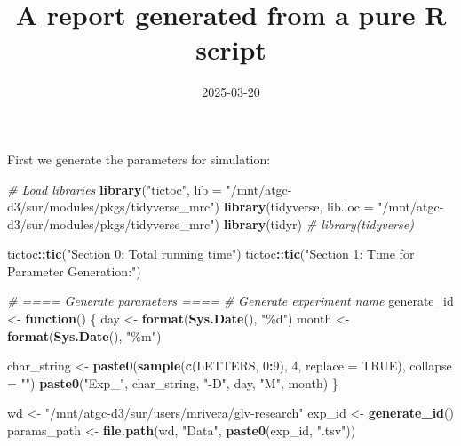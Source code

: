 \documentclass[
]{article}
\title{A report generated from a pure R script}
\author{}
\date{\vspace{-2.5em}2025-03-20}
\newenvironment{Shaded}{\begin{snugshade}}{\end{snugshade}}
\newcommand{\AttributeTok}[1]{\textcolor[rgb]{0.13,0.29,0.53}{#1}}
\newcommand{\CommentTok}[1]{\textcolor[rgb]{0.56,0.35,0.01}{\textit{#1}}}
\newcommand{\ConstantTok}[1]{\textcolor[rgb]{0.56,0.35,0.01}{#1}}
\newcommand{\ControlFlowTok}[1]{\textcolor[rgb]{0.13,0.29,0.53}{\textbf{#1}}}
\newcommand{\DecValTok}[1]{\textcolor[rgb]{0.00,0.00,0.81}{#1}}
\newcommand{\FunctionTok}[1]{\textcolor[rgb]{0.13,0.29,0.53}{\textbf{#1}}}
\newcommand{\NormalTok}[1]{#1}
\newcommand{\OtherTok}[1]{\textcolor[rgb]{0.56,0.35,0.01}{#1}}
\newcommand{\SpecialCharTok}[1]{\textcolor[rgb]{0.81,0.36,0.00}{\textbf{#1}}}
\newcommand{\StringTok}[1]{\textcolor[rgb]{0.31,0.60,0.02}{#1}}
\begin{document}
\maketitle

First we generate the parameters for simulation:

\begin{Shaded}
\begin{Highlighting}[]
\CommentTok{\# Load libraries}
\FunctionTok{library}\NormalTok{(}\StringTok{"tictoc"}\NormalTok{, }\AttributeTok{lib =} \StringTok{"/mnt/atgc{-}d3/sur/modules/pkgs/tidyverse\_mrc"}\NormalTok{)}
\FunctionTok{library}\NormalTok{(tidyverse, }\AttributeTok{lib.loc =} \StringTok{"/mnt/atgc{-}d3/sur/modules/pkgs/tidyverse\_mrc"}\NormalTok{)}
\FunctionTok{library}\NormalTok{(tidyr)}
\CommentTok{\# library(tidyverse) }

\NormalTok{tictoc}\SpecialCharTok{::}\FunctionTok{tic}\NormalTok{(}\StringTok{"Section 0: Total running time"}\NormalTok{)}
\NormalTok{tictoc}\SpecialCharTok{::}\FunctionTok{tic}\NormalTok{(}\StringTok{"Section 1: Time for Parameter Generation:"}\NormalTok{)}

\CommentTok{\# ==== Generate parameters ====}
\CommentTok{\# Generate experiment name}
\NormalTok{generate\_id }\OtherTok{\textless{}{-}} \ControlFlowTok{function}\NormalTok{() \{}
\NormalTok{  day }\OtherTok{\textless{}{-}} \FunctionTok{format}\NormalTok{(}\FunctionTok{Sys.Date}\NormalTok{(), }\StringTok{"\%d"}\NormalTok{)}
\NormalTok{  month }\OtherTok{\textless{}{-}} \FunctionTok{format}\NormalTok{(}\FunctionTok{Sys.Date}\NormalTok{(), }\StringTok{"\%m"}\NormalTok{)}
  
\NormalTok{  char\_string }\OtherTok{\textless{}{-}} \FunctionTok{paste0}\NormalTok{(}\FunctionTok{sample}\NormalTok{(}\FunctionTok{c}\NormalTok{(LETTERS, }\DecValTok{0}\SpecialCharTok{:}\DecValTok{9}\NormalTok{), }\DecValTok{4}\NormalTok{, }\AttributeTok{replace =} \ConstantTok{TRUE}\NormalTok{), }\AttributeTok{collapse =} \StringTok{""}\NormalTok{)}
  \FunctionTok{paste0}\NormalTok{(}\StringTok{"Exp\_"}\NormalTok{, char\_string, }\StringTok{"{-}D"}\NormalTok{, day, }\StringTok{"M"}\NormalTok{, month)}
\NormalTok{\}}

\NormalTok{wd }\OtherTok{\textless{}{-}} \StringTok{"/mnt/atgc{-}d3/sur/users/mrivera/glv{-}research"}
\NormalTok{exp\_id }\OtherTok{\textless{}{-}} \FunctionTok{generate\_id}\NormalTok{()}
\NormalTok{params\_path }\OtherTok{\textless{}{-}} \FunctionTok{file.path}\NormalTok{(wd, }\StringTok{"Data"}\NormalTok{, }\FunctionTok{paste0}\NormalTok{(exp\_id, }\StringTok{".tsv"}\NormalTok{))}
\end{Highlighting}
\end{Shaded}
\end{document}
